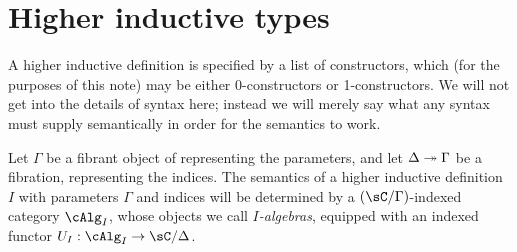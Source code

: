\documentclass{amsart}
\begin{document}
\section{Higher inductive types}
\label{sec:hits}

A higher inductive definition is specified by a list of constructors, which (for the purposes of this note) may be either 0-constructors or 1-constructors.
We will not get into the details of syntax here; instead we will merely say what any syntax must supply semantically in order for the semantics to work.

Let $\Gamma$ be a fibrant object of \sC representing the parameters, and let $\Delta\twoheadrightarrow\Gamma$ be a fibration, representing the indices.
The semantics of a higher inductive definition $I$ with parameters $\Gamma$ and indices \Delta will be determined by a $(\sC/\Gamma)$-indexed category $\cAlg_I$, whose objects we call \emph{$I$-algebras}, equipped with an indexed functor $U_I:\cAlg_I \to \sC/\Delta$.
\end{document}
